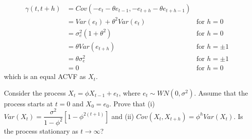 \documentclass[10pt,a4paper]{exam}
\begin{document}
\begin{questions}
\begin{solution}
\begin{align*}
\gamma(t, t+h)		&= Cov\left(-e_t - \theta e_{t-1}, -e_{t+h} - \theta e_{t+h-1}\right)\\
							&= Var(e_t) + \theta^2Var(e_t) & \text{for }h = 0\\
							&= \sigma^2_e (1 + \theta^2) & \text{for }h = 0\\
							&= \theta Var(e_{t+h}) & \text{for }h = \pm 1\\
							&= \theta \sigma^2_e & \text{for }h = \pm 1\\
							&= 0& \text{for }h = 0
\end{align*}
which is an equal ACVF as $X_t$.
\end{solution}


















































\question Consider the process $X_t = \phi X_{t-1} + e_t$, where $e_t \sim WN(0, \sigma^2)$. Assume that the process starts at $t = 0$ and $X_0 = e_0$. Prove that (i) $Var(X_t) = \dfrac{\sigma^2}{1 - \phi^2}[1 - \phi^{2(t+1)}]$ and (ii) $Cov(X_t, X_{t+h}) = \phi^h Var(X_t)$. Is the process stationary as $t \to \infty$?


\end{questions}
\end{document}
